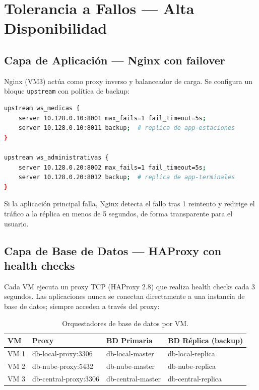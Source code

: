 \documentclass[11pt,a4paper]{article}
\begin{document}
\section{Tolerancia a Fallos — Alta Disponibilidad}

\subsection{Capa de Aplicación — Nginx con failover}

Nginx (VM3) actúa como proxy inverso y balanceador de carga. Se configura un bloque
\texttt{upstream} con política de backup:

\begin{lstlisting}[language=bash, caption=Configuración de upstream con failover en Nginx]
upstream ws_medicas {
    server 10.128.0.10:8001 max_fails=1 fail_timeout=5s;
    server 10.128.0.10:8011 backup;  # replica de app-estaciones
}

upstream ws_administrativas {
    server 10.128.0.20:8002 max_fails=1 fail_timeout=5s;
    server 10.128.0.20:8012 backup;  # replica de app-terminales
}
\end{lstlisting}

Si la aplicación principal falla, Nginx detecta el fallo tras 1 reintento y redirige
el tráfico a la réplica en menos de 5 segundos, de forma transparente para el usuario.

\subsection{Capa de Base de Datos — HAProxy con health checks}

Cada VM ejecuta un proxy TCP (HAProxy 2.8) que realiza health checks cada 3 segundos.
Las aplicaciones nunca se conectan directamente a una instancia de base de datos;
siempre acceden a través del proxy:

\begin{table}[h!]
\centering
\begin{tabular}{llll}
\toprule
\textbf{VM} & \textbf{Proxy} & \textbf{BD Primaria} & \textbf{BD Réplica (backup)} \\
\midrule
VM 1 & db-local-proxy:3306  & db-local-master  & db-local-replica  \\
VM 2 & db-nube-proxy:5432   & db-nube-master   & db-nube-replica   \\
VM 3 & db-central-proxy:3306 & db-central-master & db-central-replica \\
\bottomrule
\end{tabular}
\caption{Orquestadores de base de datos por VM.}
\end{table}
\end{document}
